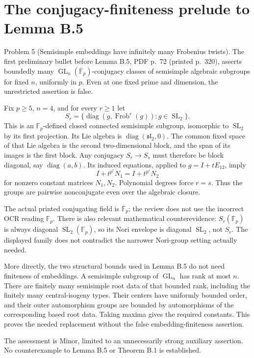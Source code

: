 \documentclass[10pt]{article}
\begin{document}
\section*{The conjugacy-finiteness prelude to Lemma B.5}
Problem 5 (Semisimple embeddings have infinitely many Frobenius twists).  The first preliminary bullet before Lemma B.5, PDF p. 72 (printed p. 320), asserts boundedly many \(\operatorname{GL}_n(\overline{\mathbb F}_p)\)-conjugacy classes of semisimple algebraic subgroups for fixed \(n\), uniformly in \(p\). Even at one fixed prime and dimension, the unrestricted assertion is false.\par
Fix \(p\ge5\), \(n=4\), and for every \(r\ge1\) let \[S_r=\{\operatorname{diag}(g,\operatorname{Frob}^{r}(g)):g\in\operatorname{SL}_2\}.\] This is an \(\mathbb F_p\)-defined closed connected semisimple subgroup, isomorphic to \(\operatorname{SL}_2\) by its first projection. Its Lie algebra is \(\operatorname{diag}(\mathfrak{sl}_2,0)\). The common fixed space of that Lie algebra is the second two-dimensional block, and the span of its images is the first block. Any conjugacy \(S_r\to S_s\) must therefore be block diagonal, say \(\operatorname{diag}(a,b)\). Its induced equations, applied to \(g=I+tE_{12}\), imply \[I+t^{p^r}N_1=I+t^{p^s}N_2\] for nonzero constant matrices \(N_1,N_2\). Polynomial degrees force \(r=s\). Thus the groups are pairwise nonconjugate even over the algebraic closure.\par
The actual printed conjugating field is \(\overline{\mathbb F}_p\); the review does not use the incorrect OCR reading \(\mathbb F_p\). There is also relevant mathematical counterevidence: \(S_r(\mathbb F_p)\) is always diagonal \(\operatorname{SL}_2(\mathbb F_p)\), so its Nori envelope is diagonal \(\operatorname{SL}_2\), not \(S_r\). The displayed family does not contradict the narrower Nori-group setting actually needed.\par
More directly, the two structural bounds used in Lemma B.5 do not need finiteness of embeddings. A semisimple subgroup of \(\operatorname{GL}_n\) has rank at most \(n\). There are finitely many semisimple root data of that bounded rank, including the finitely many central-isogeny types. Their centers have uniformly bounded order, and their outer automorphism groups are bounded by automorphisms of the corresponding based root data. Taking maxima gives the required constants. This proves the needed replacement without the false embedding-finiteness assertion.\par
The assessment is Minor, limited to an unnecessarily strong auxiliary assertion. No counterexample to Lemma B.5 or Theorem B.1 is established.\par
\end{document}
